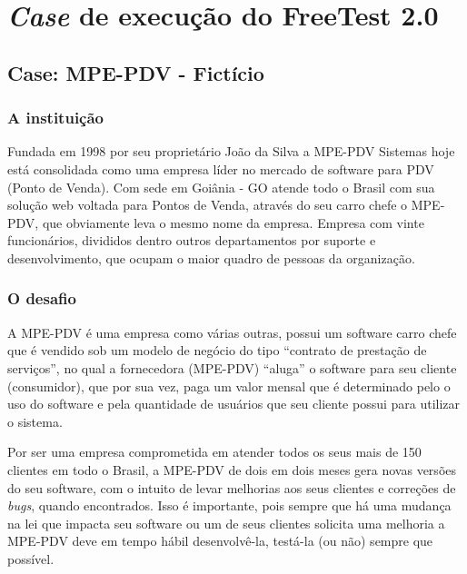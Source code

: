 \chapter{\textit{Case} de execução do FreeTest 2.0}
\label{sec:caseexecucaofreetest20}


\section{Case: MPE-PDV - Fictício}
\label{sec:apendicempe}

\subsection{A instituição}

Fundada em 1998 por seu proprietário João da Silva a MPE-PDV Sistemas hoje está consolidada como uma empresa líder no mercado de software para PDV (Ponto de Venda). Com sede em Goiânia - GO atende todo o Brasil com sua solução web voltada para Pontos de Venda, através do seu carro chefe o MPE-PDV, que obviamente leva o mesmo nome da empresa. Empresa com vinte funcionários, divididos dentro outros departamentos por suporte e desenvolvimento, que ocupam o maior quadro de pessoas da organização.

\subsection{O desafio}

A MPE-PDV é uma empresa como várias outras, possui um software carro chefe que é vendido sob um modelo de negócio do tipo “contrato de prestação de serviços”, no qual a fornecedora (MPE-PDV) “aluga” o software para seu cliente (consumidor), que por sua vez, paga um valor mensal que é determinado pelo o uso do software e pela quantidade de usuários que seu cliente possui para utilizar o sistema.

Por ser uma empresa comprometida em atender todos os seus mais de 150 clientes em todo o Brasil, a MPE-PDV de dois em dois meses gera novas versões do seu software, com o intuito de levar melhorias aos seus clientes e correções de \textit{bugs}, quando encontrados. Isso é importante, pois sempre que há uma mudança na lei que impacta seu software ou um de seus clientes solicita uma melhoria a MPE-PDV deve em tempo hábil desenvolvê-la, testá-la (ou não) sempre que possível.

